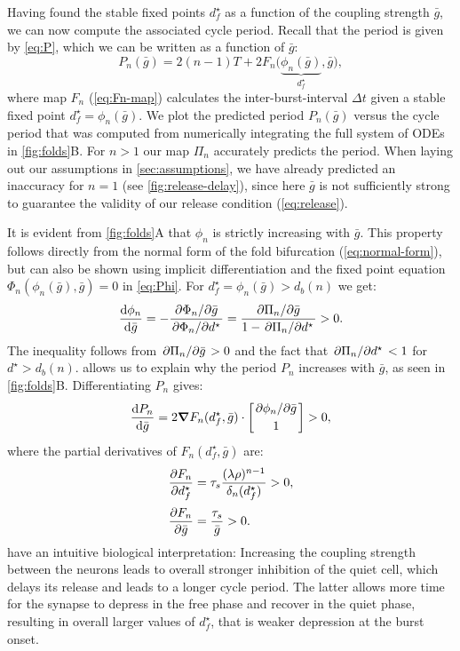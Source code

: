 \documentclass[utf8,draft]{frontiersFPHY} %
\newcommand{\dstar}{d^\star}
\newcommand{\gbar}{\bar g}
\newcommand{\delt}{\Delta t}
\newcommand{\taus}{\tau_s}
\newcommand{\dn}{\delta_n}
\begin{document}
Having found the stable fixed points $\dstar_f$ as a function of the coupling strength $\gbar$, we can now compute the associated cycle period.
Recall that the period is given by \cref{eq:P}, which we can be written as a function of $\gbar$:
\begin{equation}
  \label{eq:period}
  P_n(\gbar) = 2(n-1)T + 2F_n\big(\underbrace{\phi_n(\gbar)}_{\dstar_f}, \gbar\big),
\end{equation}
where map $F_n$ (\cref{eq:Fn-map}) calculates the inter-burst-interval $\delt$ given a stable fixed point $\dstar_f=\phi_n(\gbar)$.
We plot the predicted period $P_n(\gbar)$ versus the cycle period that was computed from numerically integrating the full system of ODEs in \cref{fig:folds}B.
For $n>1$ our map $\Pi_n$ accurately predicts the period.
When laying out our assumptions in \cref{sec:assumptions}, we have already predicted an inaccuracy for $n=1$ (see \cref{fig:release-delay}), since here $\gbar$ is not sufficiently strong to guarantee the validity of our release condition (\cref{eq:release}).

It is evident from \cref{fig:folds}A that $\phi_n$ is strictly increasing with $\gbar$.
This property follows directly from the normal form of the fold bifurcation (\cref{eq:normal-form}), but can also be shown using implicit differentiation and the fixed point equation $\Phi_n(\phi_n(\gbar), \gbar)=0$ in \cref{eq:Phi}. For $\dstar_f=\phi_n(\gbar)>d_b(n)$ we get:
\begin{equation}
  \label{eq:dstardg}
  \dv{\phi_n}{\gbar} = -\frac{\pdv*{\Phi_n}{\gbar}}{\pdv*{\Phi_n}{\dstar}} =
  \frac{\pdv*{\Pi_n}{\gbar}}{1-\pdv*{\Pi_n}{\dstar}}>0.
\end{equation}
The inequality follows from $\pdv*{\Pi_n}{\gbar}>0$ and the fact that $\pdv*{\Pi_n}{\dstar}<1$ for $\dstar>d_b(n)$.
 allows us to explain why the period $P_n$ increases with $\gbar$, as seen in \cref{fig:folds}B.
Differentiating $P_n$ gives:
\begin{equation}
  \label{eq:dPdg}
  \dv{P_{n}}{\gbar} = 2\grad F_n(\dstar_f, \gbar) \cdot
                      \begin{bmatrix}\pdv*{\phi_n}{\gbar}\\[0.5ex] 1\end{bmatrix}>0,
\end{equation}
where the partial derivatives of $F_n(\dstar_f, \gbar)$ are:
\begin{align}
  \pdv{F_n}{\dstar_f} &= \taus \frac{(\lambda\rho)^{n-1}}{\dn(\dstar_f)}>0,\\[0.5ex]
  \pdv{F_n}{\gbar}  &= \frac{\taus}{\gbar}>0.
\end{align}
 have an intuitive biological interpretation:
Increasing the coupling strength between the neurons leads to overall stronger inhibition of the quiet cell, which delays its release and leads to a longer cycle period.
The latter allows more time for the synapse to depress in the free phase and recover in the quiet phase, resulting in overall larger values of $\dstar_f$, that is weaker depression at the burst onset.
\end{document}
